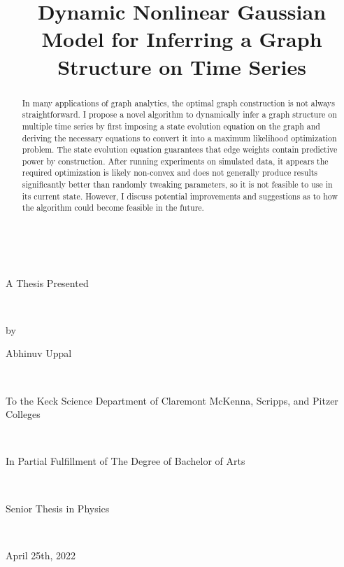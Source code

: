 \documentclass[12pt]{article}
\title{\Huge Dynamic Nonlinear Gaussian Model for Inferring a Graph Structure on Time Series}
\date{}
\theoremstyle{definition}
\begin{document}
\maketitle

\begin{center}
    
    $\;$
    
    {\huge A Thesis Presented

    $\;$ \newline

    by 

    Abhinuv Uppal 

    $\;$ \newline


    To the Keck Science Department
    of
    Claremont McKenna, Scripps, and Pitzer Colleges

    $\;$ \newline

    In Partial Fulfillment of
    The Degree of Bachelor of Arts

    $\;$ \newline

    Senior Thesis in Physics

    $\;$ \newline
    
    April 25th, 2022}


\end{center}

\newpage


\begin{abstract}
	In many applications of graph analytics, the optimal graph construction is not always straightforward. I propose a novel algorithm to dynamically infer a graph structure on multiple time series by first imposing a state evolution equation on the graph and deriving the necessary equations to convert it into a maximum likelihood optimization problem. The state evolution equation guarantees that edge weights contain predictive power by construction. After running experiments on simulated data, it appears the required optimization is likely non-convex and does not generally produce results significantly better than randomly tweaking parameters, so it is not feasible to use in its current state. However, I discuss potential improvements and suggestions as to how the algorithm could become feasible in the future.
\end{abstract}
\end{document}
